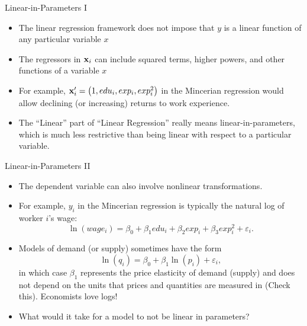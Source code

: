 \documentclass[english,xcolor={dvipsnames},aspectratio=169]{beamer}
\begin{document}

\begin{frame}{Linear-in-Parameters I}
\begin{itemize}
	\item The linear regression framework does not impose that $y$ is a linear function of any
	particular variable $x$

	\medskip
	\item The regressors in ${\bf x}_i$ can include squared terms, higher powers, and other functions of 
	a variable $x$

	\medskip
	\item For example, ${\bf x}_i' = \left(1,edu_i,exp_i,exp_i^2\right)$ in the Mincerian regression would allow
	declining (or increasing) returns to work experience. 

	\medskip
	\item The ``Linear'' part of ``Linear Regression'' really means linear-in-parameters, which is much less
	 restrictive than being linear with respect to a particular variable.
\end{itemize}
\end{frame}

\begin{frame}{Linear-in-Parameters II}
\begin{itemize}
	\item The dependent variable can also involve nonlinear transformations.

	\smallskip	
	\item For example, $y_{i}$ in the Mincerian regression is typically the natural log of worker $i$'s wage:\[
\ln \left(wage_{i}\right)=\beta_{0}+\beta_{1}edu_{i}+\beta_{2}exp_{i}+\beta_{3}exp_{i}^{2}+\varepsilon_{i}.
\]

	\smallskip
	\item Models of demand (or supply) sometimes have the form\[
		\ln \left( q_{i} \right) = \beta_0 + \beta_1 \ln \left( p_{i}\right) + \varepsilon_i,
	\]
	in which case $ \beta_1$ represents the price elasticity of demand (supply) and does not depend on the units that prices
	and quantities are measured in  (Check this). Economists love logs!
	

	\smallskip
	\item What would it take for a model to not be linear in parameters? 
\end{itemize}
\end{frame}
\end{document}
